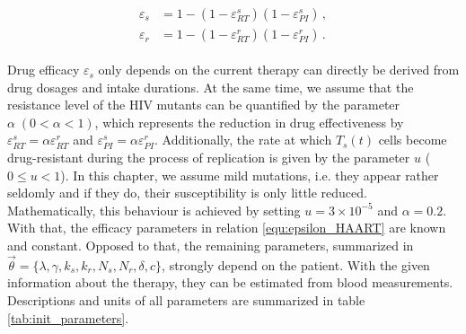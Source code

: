 \begin{align}
    \begin{split}
        \varepsilon_s &= 1 - (1-\varepsilon_{RT}^s)(1-\varepsilon_{PI}^s)\, ,\\
        \varepsilon_r &= 1 - (1-\varepsilon_{RT}^r)(1-\varepsilon_{PI}^r) \,\text{.}
    \end{split}
    \label{equ:epsilon_HAART}
\end{align}

Drug efficacy $\varepsilon_s$ only depends on the current therapy can directly be derived from drug dosages and intake durations.
At the same time, we assume that the resistance level of the HIV mutants can be quantified by the parameter $\alpha\; (0 < \alpha < 1)$, 
which represents the reduction in drug effectiveness by $\varepsilon_{RT}^s = \alpha \varepsilon_{RT}^r$ and $\varepsilon_{PI}^s = \alpha \varepsilon_{PI}^r$.
Additionally, the rate at which $T_s(t)$ cells become drug-resistant during the process of replication is given by the parameter $u$ ($0 \leq u < 1$).
In this chapter, we assume mild mutations, i.e. they appear rather seldomly and if they do, their susceptibility is only little reduced.
Mathematically, this behaviour is achieved by setting $u = 3 \times 10^{-5}$ and $\alpha = 0.2$.
With that, the efficacy parameters in relation \ref{equ:epsilon_HAART} are known and constant.\newline
Opposed to that, the remaining parameters, summarized in $\vec{\theta} = \{\lambda, \gamma, k_s, k_r, N_s, N_r, \delta, c\}$, strongly depend on the patient.
With the given information about the therapy, they can be estimated from blood measurements.
Descriptions and units of all parameters are summarized in table \ref{tab:init_parameters}.\par

